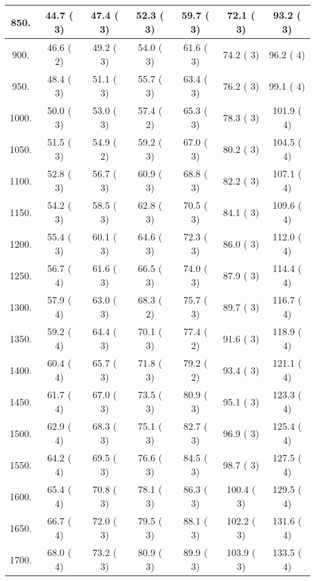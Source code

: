 \begin{tabular}{|c||c|c|c|c|c|c|}
\hline
  850. &    44.7 (      3) &    47.4 (      3) &    52.3 (      3) &    59.7 (      3) &    72.1 (      3) &    93.2 (      3)\tabularnewline
\hline
  900. &    46.6 (      2) &    49.2 (      3) &    54.0 (      3) &    61.6 (      3) &    74.2 (      3) &    96.2 (      4)\tabularnewline
\hline
  950. &    48.4 (      3) &    51.1 (      3) &    55.7 (      3) &    63.4 (      3) &    76.2 (      3) &    99.1 (      4)\tabularnewline
\hline
 1000. &    50.0 (      3) &    53.0 (      3) &    57.4 (      2) &    65.3 (      3) &    78.3 (      3) &   101.9 (      4)\tabularnewline
\hline
 1050. &    51.5 (      3) &    54.9 (      2) &    59.2 (      3) &    67.0 (      3) &    80.2 (      3) &   104.5 (      4)\tabularnewline
\hline
 1100. &    52.8 (      3) &    56.7 (      3) &    60.9 (      3) &    68.8 (      3) &    82.2 (      3) &   107.1 (      4)\tabularnewline
\hline
 1150. &    54.2 (      3) &    58.5 (      3) &    62.8 (      3) &    70.5 (      3) &    84.1 (      3) &   109.6 (      4)\tabularnewline
\hline
 1200. &    55.4 (      3) &    60.1 (      3) &    64.6 (      3) &    72.3 (      3) &    86.0 (      3) &   112.0 (      4)\tabularnewline
\hline
 1250. &    56.7 (      4) &    61.6 (      3) &    66.5 (      3) &    74.0 (      3) &    87.9 (      3) &   114.4 (      4)\tabularnewline
\hline
 1300. &    57.9 (      4) &    63.0 (      3) &    68.3 (      2) &    75.7 (      3) &    89.7 (      3) &   116.7 (      4)\tabularnewline
\hline
 1350. &    59.2 (      4) &    64.4 (      3) &    70.1 (      3) &    77.4 (      2) &    91.6 (      3) &   118.9 (      4)\tabularnewline
\hline
 1400. &    60.4 (      4) &    65.7 (      3) &    71.8 (      3) &    79.2 (      2) &    93.4 (      3) &   121.1 (      4)\tabularnewline
\hline
 1450. &    61.7 (      4) &    67.0 (      3) &    73.5 (      3) &    80.9 (      3) &    95.1 (      3) &   123.3 (      4)\tabularnewline
\hline
 1500. &    62.9 (      4) &    68.3 (      3) &    75.1 (      3) &    82.7 (      3) &    96.9 (      3) &   125.4 (      4)\tabularnewline
\hline
 1550. &    64.2 (      4) &    69.5 (      3) &    76.6 (      3) &    84.5 (      3) &    98.7 (      3) &   127.5 (      4)\tabularnewline
\hline
 1600. &    65.4 (      4) &    70.8 (      3) &    78.1 (      3) &    86.3 (      3) &   100.4 (      3) &   129.5 (      4)\tabularnewline
\hline
 1650. &    66.7 (      4) &    72.0 (      3) &    79.5 (      3) &    88.1 (      3) &   102.2 (      3) &   131.6 (      4)\tabularnewline
\hline
 1700. &    68.0 (      4) &    73.2 (      3) &    80.9 (      3) &    89.9 (      3) &   103.9 (      3) &   133.5 (      4)\tabularnewline

\end{tabular}
